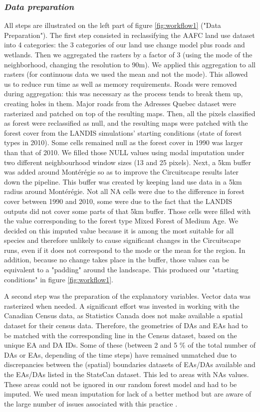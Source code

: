\subsubsection*{\textit{Data preparation}}

All steps are illustrated on the left part of figure \ref{fig:workflow1} ("Data Preparation"). The first step consisted in reclassifying the AAFC land use dataset into 4 categories: the 3 categories of our land use change model plus roads and wetlands. Then we aggregated the rasters by a factor of 3 (using the mode of the neighborhood, changing the resolution to 90m). We applied this aggregation to all rasters (for continuous data we used the mean and not the mode). This allowed us to reduce run time as well as memory requirements. Roads were removed during aggregation: this was necessary as the process tends to break them up, creating holes in them. Major roads from the Adresses Quebec dataset were rasterized and patched on top of the resulting maps. Then, all the pixels classified as forest were reclassified as null, and the resulting maps were patched with the forest cover from the LANDIS simulations' starting conditions (state of forest types in 2010). Some cells remained null as the forest cover in 1990 was larger than that of 2010. We filled those NULL values using modal imputation under two different neighbourhood window sizes (13 and 25 pixels). Next, a 5km buffer was added around Montérégie so as to improve the Circuitscape results later down the pipeline. This buffer was created by keeping land use data in a 5km radius around Montérégie. Not all NA cells were due to the difference in forest cover between 1990 and 2010, some were due to the fact that the LANDIS outputs did not cover some parts of that 5km buffer. Those cells were filled with the value corresponding to the forest type Mixed Forest of Medium Age. We decided on this imputed value because it is among the most suitable for all species and therefore unlikely to cause significant changes in the Circuitscape runs, even if it does not correspond to the mode or the mean for the region. In addition, because no change takes place in the buffer, those values can be equivalent to a "padding" around the landscape. This produced our "starting conditions" in figure \ref{fig:workflow1}.

A second step was the preparation of the explanatory variables. Vector data was rasterized when needed. A significant effort was invested in working with the Canadian Census data, as Statistics Canada does not make available a spatial dataset for their census data. Therefore, the geometries of DAs and EAs had to be matched with the corresponding line in the Census dataset, based on the unique EA and DA IDs. Some of these (between 2 and 5 \% of the total number of DAs or EAs, depending of the time steps) have remained unmatched due to discrepancies between the (spatial) boundaries datasets of EAs/DAs available and the EAs/DAs listed in the StatsCan dataset. This led to areas with NAs values. These areas could not be ignored in our random forest model and had to be imputed. We used mean imputation for lack of a better method but are aware of the large number of issues associated with this practice \citep[see][]{lodder_impute_2014}.

